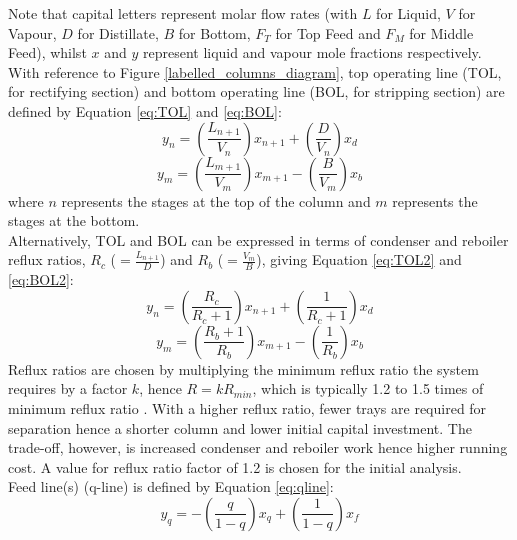         \noindent Note that capital letters represent molar flow rates (with $L$ for Liquid, $V$ for Vapour, $D$ for Distillate, $B$ for Bottom, $F_T$ for Top Feed and $F_M$ for Middle Feed), whilst $x$ and $y$ represent liquid and vapour mole fractions respectively. \\
        With reference to Figure \ref{labelled_columns_diagram}, top operating line (TOL, for rectifying section) and bottom operating line (BOL, for stripping section) are defined by Equation \ref{eq:TOL} and \ref{eq:BOL}:
        \begin{equation}
            y_n = \left(\frac{L_{n+1}}{V_n}\right)x_{n+1} + \left(\frac{D}{V_n}\right)x_d
            \label{eq:TOL}
        \end{equation}
        \begin{equation}
            y_m = \left(\frac{L_{m+1}}{V_m}\right)x_{m+1} - \left(\frac{B}{V_m}\right)x_b
            \label{eq:BOL}
        \end{equation}
        where $n$ represents the stages at the top of the column and $m$ represents the stages at the bottom. \\
        Alternatively, TOL and BOL can be expressed in terms of condenser and reboiler reflux ratios, $R_c$ ($=\frac{L_{n+1}}{D}$) and $R_b$ ($=\frac{V_m}{B}$), giving Equation \ref{eq:TOL2} and \ref{eq:BOL2}: \\
        \begin{equation}
            y_n = \left(\frac{R_c}{R_c+1}\right)x_{n+1} + \left(\frac{1}{R_c+1}\right)x_d
            \label{eq:TOL2}
        \end{equation}
        \begin{equation}
            y_m = \left(\frac{R_b+1}{R_b}\right)x_{m+1} - \left(\frac{1}{R_b}\right)x_b
            \label{eq:BOL2}
        \end{equation}
        Reflux ratios are chosen by multiplying the minimum reflux ratio the system requires by a factor $k$, hence $R=kR_{min}$, which is typically 1.2 to 1.5 times of minimum reflux ratio \citep{treybal2004}. With a higher reflux ratio, fewer trays are required for separation hence a shorter column and lower initial capital investment. The trade-off, however, is increased condenser and reboiler work hence higher running cost. A value for reflux ratio factor of 1.2 is chosen for the initial analysis. \\
        Feed line(s) (q-line) is defined by Equation \ref{eq:qline}:
        \begin{equation}
            y_q = -\left(\frac{q}{1-q}\right)x_q + \left(\frac{1}{1-q}\right)x_f
            \label{eq:qline}
        \end{equation}

